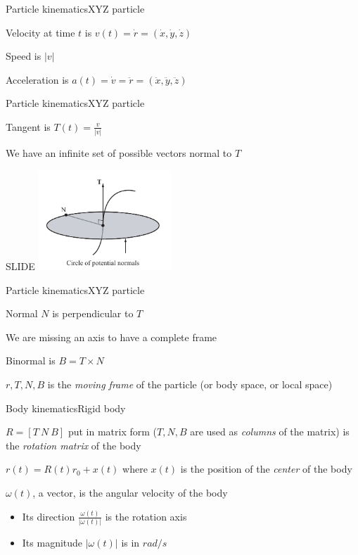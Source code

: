 \documentclass{beamer}
\begin{document}
\begin{slide}{Particle kinematics}{XYZ particle}{
\item Velocity at time $t$ is $v(t) = \dot r = (\dot x, \dot y, \dot z)$
\item Speed is $|v|$
\item Acceleration is $a(t) = \dot v = \ddot r  = (\ddot x, \ddot y, \ddot z)$
}\end{slide}

\begin{slide}{Particle kinematics}{XYZ particle}{
\item Tangent is $T(t) = \frac{v}{|v|}$
\item We have an infinite set of possible vectors normal to $T$
}\end{slide}

\begin{frame}{SLIDE}
\center
\includegraphics[width=5cm]{Pics/Fig2_3.png}
\end{frame}

\begin{slide}{Particle kinematics}{XYZ particle}{
\item Normal $N$ is perpendicular to $T$
\item We are missing an axis to have a complete frame
\item Binormal is $B = T \times N$
\item $r,T,N,B$ is the \textit{moving frame} of the particle (or body space, or local space)
}\end{slide}

\begin{slide}{Body kinematics}{Rigid body}{
\item $R = \left[ T\ N\ B \right] $ put in matrix form ($T, N, B$ are used as \textit{columns} of the matrix) is the \textit{rotation matrix} of the body
\item $r(t) = R(t)r_0 + x(t)$ where $x(t)$ is the position of the \textit{center} of the body
\item $\omega(t)$, a vector, is the angular velocity of the body
\begin{itemize}
\item Its direction $\frac{\omega(t)}{|\omega(t)|}$ is the rotation axis
\item Its magnitude $|\omega(t)|$ is in $rad/s$
\end{itemize}
}\end{slide}
\end{document}
